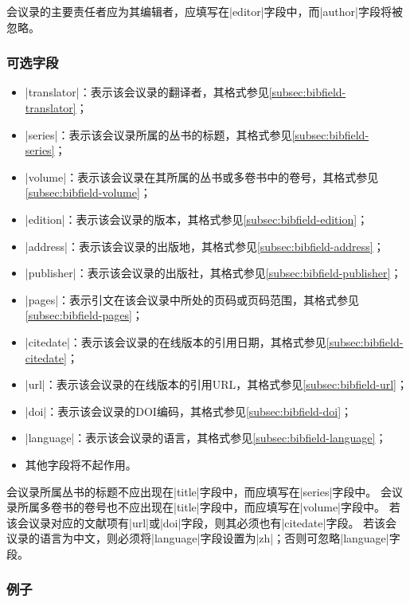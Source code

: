 \begin{note}
会议录的主要责任者应为其编辑者，应填写在|editor|字段中，而|author|字段将被忽略。
\end{note}

\subsubsection{可选字段}

\begin{itemize}
\item |translator|：表示该会议录的翻译者，其格式参见\ref{subsec:bibfield-translator}；
\item |series|：表示该会议录所属的丛书的标题，其格式参见\ref{subsec:bibfield-series}；
\item |volume|：表示该会议录在其所属的丛书或多卷书中的卷号，其格式参见\ref{subsec:bibfield-volume}；
\item |edition|：表示该会议录的版本，其格式参见\ref{subsec:bibfield-edition}；
\item |address|：表示该会议录的出版地，其格式参见\ref{subsec:bibfield-address}；
\item |publisher|：表示该会议录的出版社，其格式参见\ref{subsec:bibfield-publisher}；
\item |pages|：表示引文在该会议录中所处的页码或页码范围，其格式参见\ref{subsec:bibfield-pages}；
\item |citedate|：表示该会议录的在线版本的引用日期，其格式参见\ref{subsec:bibfield-citedate}；
\item |url|：表示该会议录的在线版本的引用URL，其格式参见\ref{subsec:bibfield-url}；
\item |doi|：表示该会议录的DOI编码，其格式参见\ref{subsec:bibfield-doi}；
\item |language|：表示该会议录的语言，其格式参见\ref{subsec:bibfield-language}；
\item 其他字段将不起作用。
\end{itemize}

\begin{note}
会议录所属丛书的标题不应出现在|title|字段中，而应填写在|series|字段中。
会议录所属多卷书的卷号也不应出现在|title|字段中，而应填写在|volume|字段中。
若该会议录对应的文献项有|url|或|doi|字段，则其必须也有|citedate|字段。
若该会议录的语言为中文，则必须将|language|字段设置为|zh|；否则可忽略|language|字段。
\end{note}

\subsubsection{例子}

